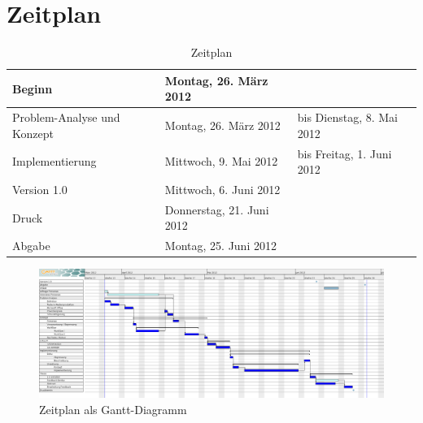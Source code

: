 \documentclass[11pt,a4paper]{article}
\begin{document}
\section{Zeitplan}

\begin{table}[htb]
\begin{tabular}{l l l}
Beginn & Montag, 26. März 2012 & \\
\hline
Problem-Analyse und Konzept & Montag, 26. März 2012 & bis Dienstag, 8. Mai 2012 \\
Implementierung & Mittwoch, 9. Mai 2012 & bis Freitag, 1. Juni 2012 \\
Version 1.0 & Mittwoch, 6. Juni 2012 & \\
Druck & Donnerstag, 21. Juni 2012 & \\
\hline
Abgabe & Montag, 25. Juni 2012 & \\
\end{tabular}
\caption{Zeitplan}
\end{table}

\begin{figure}[htb]
\includegraphics[width=\textwidth]{zeitplan.png}
\caption{Zeitplan als Gantt-Diagramm}
\end{figure}
\end{document}
